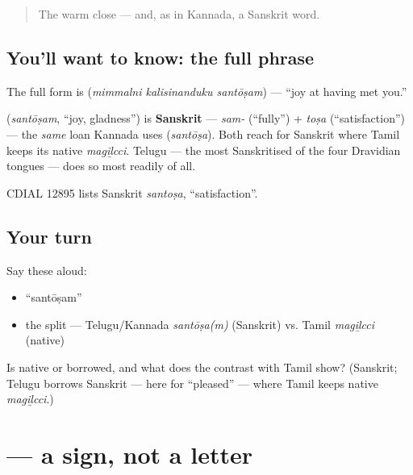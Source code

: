 \begin{quote}
The warm close — and, as in Kannada, a Sanskrit word.
\end{quote}

\subsection*{You'll want to know: the full phrase}
The full form is \textbf{  } (\emph{mimmalni kalisinanduku santōṣam}) — \textquotedblleft{}joy at having met you.\textquotedblright{}

\begin{cousinweb}
\textbf{} (\emph{santōṣam}, \textquotedblleft{}joy, gladness\textquotedblright{}) is \textbf{Sanskrit} — \emph{sam-} (\textquotedblleft{}fully\textquotedblright{}) + \emph{toṣa} (\textquotedblleft{}satisfaction\textquotedblright{}) — the \emph{same} loan Kannada uses (\emph{santōṣa}). Both reach for Sanskrit where Tamil keeps its native \emph{magiḻcci}. Telugu — the most Sanskritised of the four Dravidian tongues — does so most readily of all.

CDIAL 12895 lists Sanskrit \emph{santoṣa}, \textquotedblleft{}satisfaction\textquotedblright{}.
\end{cousinweb}

\subsection*{Your turn}
Say these aloud:

\begin{itemize}
\raggedright
  \item \textquotedblleft{}santōṣam\textquotedblright{}
  \item the split — Telugu/Kannada \emph{santōṣa(m)} (Sanskrit) vs. Tamil \emph{magiḻcci} (native)
\end{itemize}

\begin{tcolorbox}[breakable,colback=teal!4,colframe=teal!35!black,title={Before you move on}]
Is \textbf{} native or borrowed, and what does the contrast with Tamil show? (Sanskrit; Telugu borrows Sanskrit — here for \textquotedblleft{}pleased\textquotedblright{} — where Tamil keeps native \emph{magiḻcci}.)
\end{tcolorbox}
\section[\texorpdfstring{\te{ో} (ō)}{ో (ō)}]{ — a sign, not a letter}

